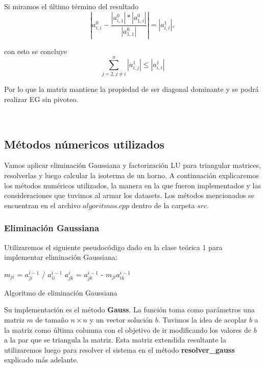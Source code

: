 \noindent Si miramos el último término del resultado
\[
    |a_{i,i}^{0} - \frac{|a_{i,1}^{0}|*|a_{1,i}^{0}|}{|a_{1,1}^{0}|} |   =  |a_{i,i}^{1}|,
\]

\noindent con esto se concluye
\[
   \sum_{j=2, j \neq i}^{n} |a_{i,j}^{1}| \leq  |a_{i,i}^{1}|
\]

\noindent Por lo que la matriz mantiene la propiedad de ser diagonal dominante y se podrá realizar EG sin pivoteo. 

\

\subsection{Métodos númericos utilizados}
Vamos aplicar eliminación Gaussiana y factorización LU para triangular matrices, resolverlas y luego calcular la isoterma de un horno. A continuación explicaremos los métodos numéricos utilizados, la manera en la que fueron implementados y las consideraciones que tuvimos al armar los datasets. Los métodos mencionados se encuentran en el archivo $algoritmos.cpp$ dentro de la carpeta $src$.

\subsubsection{Eliminación Gaussiana}

Utilizaremos el siguiente pseudocódigo dado en la clase teórica 1 para implementar eliminación Gaussiana:

\begin{algorithm}[H]
\begin{algorithmic}[1]
        \State $m_{ji}$ = $a_{ji}^{i-1}$ / $a_{ii}^{i-1}$
            \State $a_{jk}^{i}$ = $a_{jk}^{i-1}$ - $m_{ji} a_{ik}^{i-1}$
        \EndFor
    \EndFor
\EndFor
\EndFunction
\end{algorithmic}
\caption{Algoritmo de eliminación Gaussiana}
\label{alg:gauss}
\end{algorithm}

Su implementación es el método \textbf{Gauss}. La función toma como parámetros una matriz $m$ de tamaño $n \times n$ y un vector solución $b$. Tuvimos la idea de acoplar $b$ a la matriz como última columna con el objetivo de ir modificando los valores de $b$ a la par que se triangula la matriz. Esta matriz extendida resultante la utilizaremos luego para resolver el sistema en el método \textbf{resolver\_gauss} explicado más adelante. 

